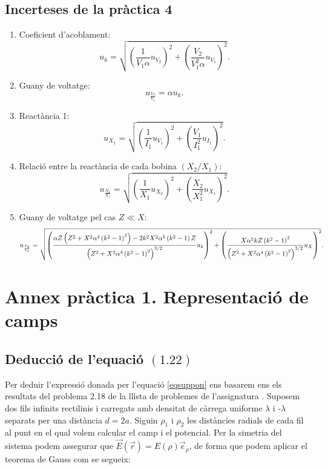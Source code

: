 \documentclass[a4paper,10.5pt]{report}
\begin{document}
\begin{appendices}
\subsection{Incerteses de la pràctica 4}
\begin{enumerate}
	\item Coeficient d'acoblament: \begin{equation}
		u_k=\sqrt{\left(\frac{1}{V_1\alpha}u_{V_2}\right)^2+\left(\frac{V_2}{V_1^2\alpha}u_{V_1}\right)^2}.
	\end{equation}
	\item Guany de voltatge: \begin{equation}
		u_{\frac{V_2}{V_1}}=\alpha u_k.
	\end{equation}
	\item Reactància 1: \begin{equation}
		u_{X_1}=\sqrt{\left(\frac{1}{I_1}u_{V_1}\right)^2+\left(\frac{V_1}{I_1^2}u_{I_1}\right)^2}.
	\end{equation}
	\item Relació entre la reactància de cada bobina $\left(X_2/X_1\right)$: \begin{equation}
		u_{\frac{X_2}{X_1}}=\sqrt{\left(\frac{1}{X_1}u_{X_2}\right)^2+\left(\frac{X_2}{X_1^2}u_{X_1}\right)^2}.
	\end{equation}
	\item Guany de voltatge pel cas $Z\ll X$: 
	\begin{equation}
		\small
		u_{\frac{V_2}{V_1}}=\sqrt{\left(\frac{\alpha Z\left(Z^2+X^2\alpha^4\left(k^2-1\right)^2\right)-2k^2X^2\alpha^5\left(k^2-1\right)Z}{\left(Z^2+X^2\alpha^4\left(k^2-1\right)^2\right)^{3/2}}u_k\right)^2+\left(\frac{X\alpha^5kZ\left(k^2-1\right)^2}{\left(Z^2+X^2\alpha^4\left(k^2-1\right)^2\right)^{3/2}}u_X\right)^{2}}.
	\end{equation}
\end{enumerate}
\newpage
\section{Annex pràctica 1. Representació de camps}
\subsection{Deducció de l'equació $(1.22)$}
\label{an:a1}
Per deduir l'expressió donada per l'equació \eqref{eqsuppon} ens basarem ens els resultats del problema 2.18 de la llista de problemes de l'assignatura \cite{ref1}. Suposem dos fils infinits rectilinis i carregats amb densitat de càrrega uniforme $\lambda$ i -$\lambda$ separats per una distància $d=2a$. Siguin $\rho_1$ i $\rho_2$ les distàncies radials de cada fil al punt en el qual volem calcular el camp i el potencial. Per la simetria del sistema podem assegurar que $\vec{E}(\vec{r}) = E(\rho) \vec{e}_{\rho}$, de forma que podem aplicar el teorema de Gauss com se segueix:


\end{appendices}
\end{document}
